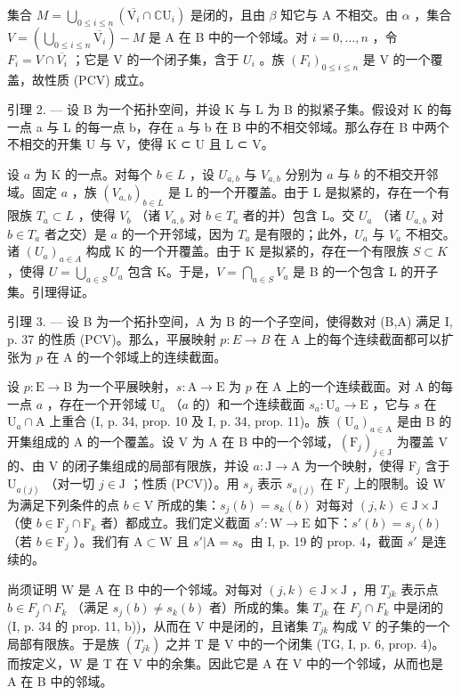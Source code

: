 集合 \(M = \bigcup_{0 \leqslant i \leqslant n} (\overline{\mathrm{V}_{i}} \cap \mathbb{C}\mathrm{U}_{i})\) 是闭的，且由 \(\beta\) 知它与 A 不相交。由 \(\alpha\) ，集合 \(V = (\bigcup_{0 \leqslant i \leqslant n} \overline{\mathrm{V}_{i}}) - M\) 是 A 在 B 中的一个邻域。对 \(i = 0, \ldots, n\) ，令 \(F_{i} = V \cap \overline{V_{i}}\) ；它是 V 的一个闭子集，含于 \(U_{i}\) 。族 \((F_{i})_{0 \leqslant i \leqslant n}\) 是 V 的一个覆盖，故性质 (PCV) 成立。

引理 2. --- 设 B 为一个拓扑空间，并设 K 与 L 为 B 的拟紧子集。假设对 K 的每一点 a 与 L 的每一点 b，存在 a 与 b 在 B 中的不相交邻域。那么存在 B 中两个不相交的开集 U 与 V，使得 K ⊂ U 且 L ⊂ V。

设 \(a\) 为 K 的一点。对每个 \(b \in L\) ，设 \(U_{a,b}\) 与 \(V_{a,b}\) 分别为 \(a\) 与 \(b\) 的不相交开邻域。固定 \(a\) ，族 \((V_{a,b})_{b \in L}\) 是 L 的一个开覆盖。由于 L 是拟紧的，存在一个有限族 \(T_a \subset L\) ，使得 \(V_b\) （诸 \(V_{a,b}\) 对 \(b \in T_a\) 者的并）包含 L。交 \(U_a\) （诸 \(U_{a,b}\) 对 \(b \in T_a\) 者之交）是 \(a\) 的一个开邻域，因为 \(T_a\) 是有限的；此外，\(U_a\) 与 \(V_a\) 不相交。诸 \((U_a)_{a \in A}\) 构成 K 的一个开覆盖。由于 K 是拟紧的，存在一个有限族 \(S \subset K\) ，使得 \(U = \bigcup_{a \in S} U_a\) 包含 K。于是，\(V = \bigcap_{a \in S} V_a\) 是 B 的一个包含 L 的开子集。引理得证。

引理 3. --- 设 B 为一个拓扑空间，A 为 B 的一个子空间，使得数对 (B,A) 满足 I, p. 37 的性质 (PCV)。那么，平展映射 \(p\colon E \to B\) 在 A 上的每个连续截面都可以扩张为 \(p\) 在 A 的一个邻域上的连续截面。

设 \(p \colon \mathrm{E} \to \mathrm{B}\) 为一个平展映射，\(s \colon \mathrm{A} \to \mathrm{E}\) 为 \(p\) 在 A 上的一个连续截面。对 A 的每一点 \(a\) ，存在一个开邻域 \(\mathrm{U}_a\) （\(a\) 的）和一个连续截面 \(s_a \colon \mathrm{U}_a \to \mathrm{E}\) ，它与 \(s\) 在 \(\mathrm{U}_a \cap \mathrm{A}\) 上重合 (I, p. 34, prop. 10 及 I, p. 34, prop. 11)。族 \((\mathrm{U}_a)_{a \in \mathrm{A}}\) 是由 B 的开集组成的 A 的一个覆盖。设 V 为 A 在 B 中的一个邻域，\((\mathrm{F}_j)_{j \in \mathrm{J}}\) 为覆盖 V 的、由 V 的闭子集组成的局部有限族，并设 \(a \colon \mathrm{J} \to \mathrm{A}\) 为一个映射，使得 \(\mathrm{F}_j\) 含于 \(\mathrm{U}_{a(j)}\) （对一切 \(j \in \mathrm{J}\) ；性质 (PCV)）。用 \(s_j\) 表示 \(s_{a(j)}\) 在 \(\mathrm{F}_j\) 上的限制。设 W 为满足下列条件的点 \(b \in \mathrm{V}\) 所成的集：\(s_j(b) = s_k(b)\) 对每对 \((j, k) \in \mathrm{J} \times \mathrm{J}\) （使 \(b \in \mathrm{F}_j \cap \mathrm{F}_k\) 者）都成立。我们定义截面 \(s' \colon \mathrm{W} \to \mathrm{E}\) 如下：\(s'(b) = s_j(b)\) （若 \(b \in \mathrm{F}_j\) ）。我们有 \(\mathrm{A} \subset \mathrm{W}\) 且 \(s' | \mathrm{A} = s\)。由 I, p. 19 的 prop. 4，截面 \(s'\) 是连续的。

尚须证明 W 是 A 在 B 中的一个邻域。对每对 \((j,k)\in\mathrm{J}\times\mathrm{J}\) ，用 \(T_{jk}\) 表示点 \(b\in F_{j}\cap F_{k}\) （满足 \(s_{j}(b)\neq s_{k}(b)\) 者）所成的集。集 \(T_{jk}\) 在 \(F_{j}\cap F_{k}\) 中是闭的 (I, p. 34 的 prop. 11, b))，从而在 V 中是闭的，且诸集 \(T_{jk}\) 构成 V 的子集的一个局部有限族。于是族 \((T_{jk})\) 之并 T 是 V 中的一个闭集 (TG, I, p. 6, prop. 4)。而按定义，W 是 T 在 V 中的余集。因此它是 A 在 V 中的一个邻域，从而也是 A 在 B 中的邻域。


